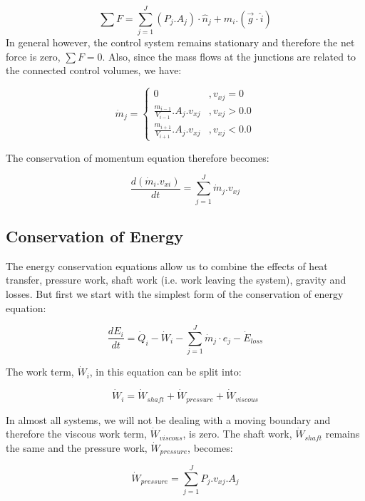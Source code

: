 \documentclass[11pt,letterpaper,titlepage]{article}
\begin{document}
$$
\sum F = \sum_{j=1}^J (P_j.A_j)\cdot \hat{n}_j + m_i.(\vec{g}\cdot \hat{i})
$$
\newline
\newline
\noindent In general however, the control system remains stationary and therefore the net force is zero, $\sum F = 0$. Also, since the mass flows at the junctions are related to the connected control volumes, we have:

\begin{equation*}
\dot{m}_j=
\begin{cases}
	0 								& ,v_{xj}=0 \\
	\frac{m_{i-1}}{V_{i-1}}.A_j.v_{xj} & ,v_{xj}>0.0 \\
	\frac{m_{i+1}}{V_{i+1}}.A_j.v_{xj} & ,v_{xj}<0.0 
\end{cases}
\end{equation*}

\noindent The conservation of momentum equation therefore becomes:

\begin{equation}
\frac{d(\dot{m}_i.v_{xi})}{dt}=\sum_{j=1}^{J} \dot{m}_j.v_{xj}
\end{equation}



\subsection{Conservation of Energy}
The energy conservation equations allow us to combine the effects of heat transfer, pressure work, shaft work (i.e. work leaving the system), gravity and losses. But first we start with the simplest form of the conservation of energy equation:

\begin{equation*}
\frac{dE_{i}}{dt}=\dot{Q}_i - \dot{W}_i - \sum_{j=1}^J \dot{m}_j \cdot e_j- \dot{E}_{loss}
\end{equation*}

\noindent
The work term, $\dot{W}_i$, in this equation can be split into:

$$
\dot{W}_i=\dot{W}_{shaft} + \dot{W}_{pressure} + \dot{W}_{viscous}
$$

\vspace{0.25cm}
\noindent
In almost all systems, we will not be dealing with a moving boundary and therefore the viscous work term, $\dot{W}_{viscous}$, is zero. The shaft work, $\dot{W}_{shaft}$ remains the same and the pressure work, $\dot{W}_{pressure}$, becomes:

$$
\dot{W}_{pressure}=\sum_{j=1}^J P_j.v_{xj}.A_j
$$
\end{document}
